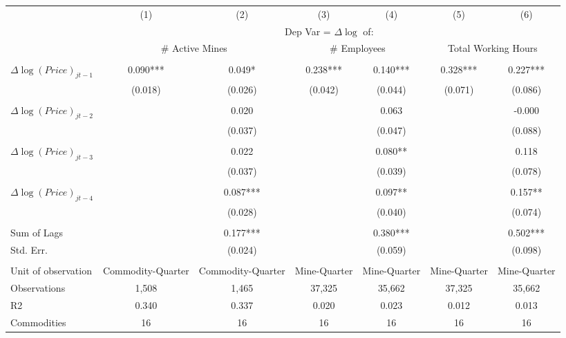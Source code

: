 \begin{tabular}{lcccccc}
\hline
      & (1)   & (2)   & (3)   & (4)   & (5)   & (6) \bigstrut[t]\\
      & \multicolumn{6}{c}{Dep Var = $\Delta\log$ of:} \bigstrut[b]\\
\cline{2-7}      & \multicolumn{2}{c}{$\#$ Active Mines} & \multicolumn{2}{c}{$\#$ Employees} & \multicolumn{2}{c}{Total Working Hours} \bigstrut\\
\hline
      &       &       &       &       &       &  \bigstrut[t]\\
$\Delta\log(Price)_{jt-1}$ & 0.090*** & 0.049* & 0.238*** & 0.140*** & 0.328*** & 0.227*** \\
      & (0.018) & (0.026) & (0.042) & (0.044) & (0.071) & (0.086) \\
      &       &       &       &       &       &  \\
$\Delta\log(Price)_{jt-2}$ &       & 0.020 &       & 0.063 &       & -0.000 \\
      &       & (0.037) &       & (0.047) &       & (0.088) \\
      &       &       &       &       &       &  \\
$\Delta\log(Price)_{jt-3}$ &       & 0.022 &       & 0.080** &       & 0.118 \\
      &       & (0.037) &       & (0.039) &       & (0.078) \\
      &       &       &       &       &       &  \\
$\Delta\log(Price)_{jt-4}$ &       & 0.087*** &       & 0.097** &       & 0.157** \\
      &       & (0.028) &       & (0.040) &       & (0.074) \\
      &       &       &       &       &       &  \\
Sum of Lags &       & 0.177*** &       & 0.380*** &       & 0.502*** \\
Std. Err. &       & (0.024) &       & (0.059) &       & (0.098) \\
      &       &       &       &       &       &  \\
Unit of observation & \multicolumn{1}{p{5em}}{Commodity-Quarter} & \multicolumn{1}{p{5em}}{Commodity-Quarter} & \multicolumn{1}{p{5em}}{Mine-Quarter} & \multicolumn{1}{p{5em}}{Mine-Quarter} & \multicolumn{1}{p{5em}}{Mine-Quarter} & \multicolumn{1}{p{5em}}{Mine-Quarter} \\
Observations & 1,508 & 1,465 & 37,325 & 35,662 & 37,325 & 35,662 \\
R2    & 0.340 & 0.337 & 0.020 & 0.023 & 0.012 & 0.013 \\
Commodities & 16    & 16    & 16    & 16    & 16    & 16 \bigstrut[b]\\
\hline
\end{tabular}%